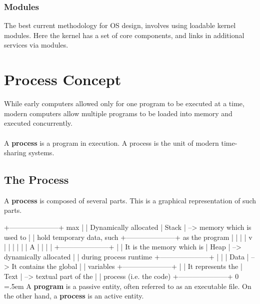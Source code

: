 \documentclass{article}
\newenvironment{cverbatim}
 {\SaveVerbatim{cverb}}
 {\endSaveVerbatim
  \flushleft\fboxrule=0pt\fboxsep=.5em
  \colorbox{cverbbg}{\BUseVerbatim{cverb}}%
  \endflushleft
}
\begin{document}
\subsubsection{Modules}
The best current methodology for OS design, involves using loadable kernel modules. Here the kernel has a set of core components, and links in additional services via modules.

\section{Process Concept}

While early computers allowed only for one program to be executed at a time, modern computers allow multiple programs to be loaded into memory and executed concurrently. \\ \\
A \textbf{process} is a program in execution. A process is the unit of modern time-sharing systems.

\subsection{The Process}
A \textbf{process} is composed of several parts. This is a graphical representation of such parts.

\begin{cverbatim}
   +---------------------+   max
   |                     |             Dynamically allocated
   |        Stack        |         --> memory which is used to
   |                     |             hold temporary data, such
   +---------------------+             as the program 
   |          |          |
   |          v          |
   |                     |
   |                     |
   |          A          |
   |          |          |
   +---------------------+
   |                     |             It is the memory which is 
   |         Heap        |         --> dynamically allocated
   |                     |             during process runtime
   +---------------------+
   |                     |            
   |         Data        |         --> It contains the global
   |                     |             variables
   +---------------------+
   |                     |             It represents the
   |         Text        |         --> textual part of the
   |                     |             process (i.e. the code)
   +---------------------+   0         
\end{cverbatim}
A \textbf{program} is a passive entity, often referred to as an executable file. On the other hand, a \textbf{process} is an active entity.
\end{document}
